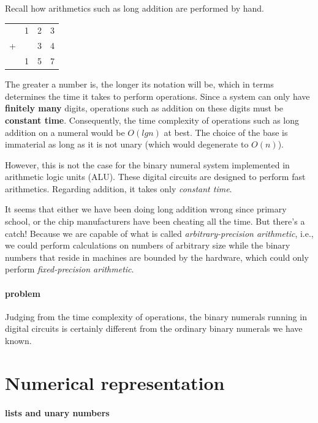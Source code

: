 \documentclass[\main/thesis.tex]{subfiles}
\begin{document}
Recall how arithmetics such as long addition are performed by hand.

\begin{center}
    \begin{tabular}{c@{\,}c@{\,}c@{\,}c}
      & 1 & 2 & 3 \\
    + &   & 3 & 4 \\
    \hline
      & 1 & 5 & 7 \\
    \end{tabular}
\end{center}

The greater a number is, the longer its notation will be, which in terms
determines the time it takes to perform operations.
Since a system can only have \textbf{finitely many} digits, operations such as
addition on these digits must be \textbf{constant time}.
Consequently, the time complexity of operations such as long addition on a
numeral would be $ O(lg n) $ at best.
The choice of the base is immaterial as long as it is not unary
(which would degenerate to $ O(n) $).

However, this is not the case for the binary numeral system implemented in
arithmetic logic units (ALU). These digital circuits are designed to perform
fast arithmetics. Regarding addition, it takes only \textit{constant time}.

It seems that either we have been doing long addition wrong since primary school,
or the chip manufacturers have been cheating all the time. But there's a catch!
Because we are capable of what is called \textit{arbitrary-precision arithmetic},
i.e., we could perform calculations on numbers of arbitrary size
while the binary numbers that reside in machines are bounded by the hardware,
which could only perform \textit{fixed-precision arithmetic}.

\paragraph{problem}
Judging from the time complexity of operations, the binary numerals running in
digital circuits is certainly different from the ordinary binary numerals we have
known.

\section{Numerical representation}

\paragraph{lists and unary numbers}
\end{document}
